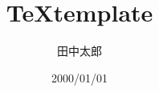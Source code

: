 \documentclass[uplatex, twocolumn, 10pt]{jsarticle}
\begin{document}
\title{\bf{\TeX \space template}}
\author{田中太郎}
\date{2000/01/01}

\begin{abstract}
    
\end{abstract}

\maketitle










\end{document}
